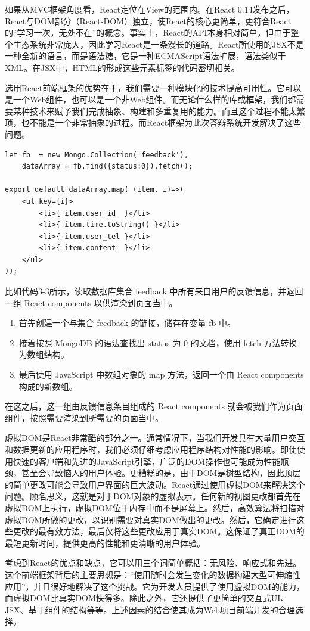如果从MVC框架角度看，React定位在View的范围内。在React 0.14发布之后，React与DOM部分（React-DOM）独立，使React的核心更简单，更符合React的“学习一次，无处不在”的概念。事实上，React的API本身相对简单，但由于整个生态系统非常庞大，因此学习React是一条漫长的道路。React所使用的JSX不是一种全新的语言，而是语法糖，它是一种ECMAScript语法扩展，语法类似于XML。在JSX中，HTML的形成这些元素标签的代码密切相关。

选用React前端框架的优势在于，我们需要一种模块化的技术提高可用性。它可以是一个Web组件，也可以是一个非Web组件。而无论什么样的库或框架，我们都需要某种技术来赋予我们完成抽象、构建和多重复用的能力。而且这个过程不能太繁琐，也不能是一个非常抽象的过程。而React框架为此次答辩系统开发解决了这些问题。

\begin{lstlisting}[title=代码 3-3：React 代码示例]
let fb	= new Mongo.Collection('feedback'),
	dataArray = fb.find({status:0}).fetch();

export default dataArray.map( (item, i)=>(
	<ul key={i}>
		<li>{ item.user_id	}</li>
		<li>{ item.time.toString() }</li>
		<li>{ item.user_tel	}</li>
		<li>{ item.content	}</li>
	</ul>
));
\end{lstlisting}

比如代码3-3所示，读取数据库集合 feedback 中所有来自用户的反馈信息，并返回一组 React components 以供渲染到页面当中。

\begin{enumerate}
	\item 首先创建一个与集合 feedback 的链接，储存在变量 fb 中。
	\item 接着按照 MongoDB 的语法查找出 status 为 0 的文档，使用 fetch 方法转换为数组结构。
	\item 最后使用 JavaScript 中数组对象的 map 方法，返回一个由 React	components 构成的新数组。
\end{enumerate}

在这之后，这一组由反馈信息条目组成的 React  components 就会被我们作为页面组件，按照需要渲染到所需要的页面当中。

虚拟DOM是React非常酷的部分之一。通常情况下，当我们开发具有大量用户交互和数据更新的应用程序时，我们必须仔细考虑应用程序结构对性能的影响。即使使用快速的客户端和先进的JavaScript引擎，广泛的DOM操作也可能成为性能瓶颈，甚至会导致恼人的用户体验。更糟糕的是，由于DOM是树型结构，因此顶层的简单更改可能会导致用户界面的巨大波动。React通过使用虚拟DOM来解决这个问题。顾名思义，这就是对于DOM对象的虚拟表示。任何新的视图更改都首先在虚拟DOM上执行，虚拟DOM位于内存中而不是屏幕上。然后，高效算法将扫描对虚拟DOM所做的更改，以识别需要对真实DOM做出的更改。然后，它确定进行这些更改的最有效方法，最后仅将这些更改应用于真实DOM。这保证了真正DOM的最短更新时间，提供更高的性能和更清晰的用户体验。

考虑到React的优点和缺点，它可以用三个词简单概括：无风险、响应式和先进。这个前端框架背后的主要思想是：“使用随时会发生变化的数据构建大型可伸缩性应用”，并且很好地解决了这个挑战。它为开发人员提供了使用虚拟DOM的能力，而虚拟DOM比真实DOM快得多。除此之外，它还提供了更简单的交互式UI、JSX、基于组件的结构等等。上述因素的结合使其成为Web项目前端开发的合理选择。

